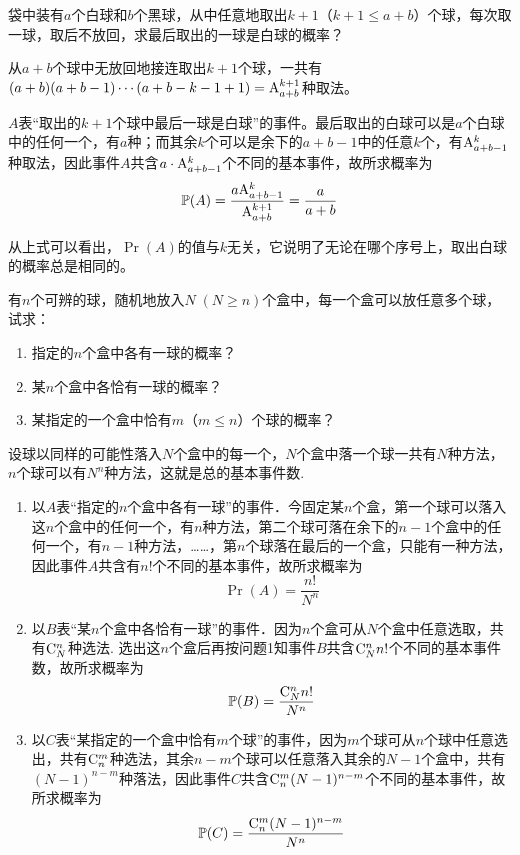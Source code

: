 \begin{example}
    袋中装有$a$个白球和$b$个黑球，从中任意地取出$k+1$（$k+1\le a+b$）个球，每次取一球，取后不放回，求最后取出的一球是白球的概率？
\end{example}

\begin{solution}
    从$a+b$个球中无放回地接连取出$k+1$个球，一共有
$(a+b)(a+b-1)\cdots(a+b-k-1+1)={\rm A}^{k+1}_{a+b}$种取法。

$A$表“取出的$k+1$个球中最后一球是白球”的事件。最后取出的白球可以是$a$个白球中的任何一个，有$a$种；而其余$k$个可以是余下的$a+b-1$中的任意$k$个，有${\rm A}^k_{a+b-1}$种取法，因此事件$A$共含$a\cdot {\rm A}^k_{a+b-1}$个不同的基本事件，故所求概率为
\[\Pr(A)=\frac{a{\rm A}^{k}_{a+b-1}}{{\rm A}^{k+1}_{a+b}}=\frac{a}{a+b}\]

从上式可以看出，$\Pr(A)$的值与$k$无关，它说明了无论在哪个序号上，取出白球的概率总是相同的。
\end{solution}

\begin{example}
    有$n$个可辨的球，随机地放入$N\; (N\ge n)$个盒中，每一个盒可以放任意多个球，试求：
\begin{enumerate}
\item 指定的$n$个盒中各有一球的概率？
\item 某$n$个盒中各恰有一球的概率？
\item 某指定的一个盒中恰有$m$（$m\le n$）个球的概率？
\end{enumerate}
\end{example}

\begin{solution}
    设球以同样的可能性落入$N$个盒中的每一个，$N$个盒中落一个球一共有$N$种方法，$n$个球可以有$N^n$种方法，这就是总的基本事件数.
\begin{enumerate}
\item 以$A$表“指定的$n$个盒中各有一球”的事件．今固定某$n$个盒，第一个球可以落入这$n$个盒中的任何一个，有$n$种方法，第二个球可落在余下的$n-1$个盒中的任何一个，有$n-1$种方法，……，第$n$个球落在最后的一个盒，只能有一种方法，因此事件$A$共含有$n!$个不同的基本事件，故所求概率为
\[\Pr(A)= \frac{n!}{N^n} \]
\item 以$B$表“某$n$个盒中各恰有一球”的事件．因为$n$个盒可从$N$个盒中任意选取，共有$\comb{n}{N}$种选法. 选出这$n$个盒后再按问题1知事件$B$共含$\comb{n}{N}n!$个不同的基本事件数，故所求概率为
\[\Pr(B)=\frac{\comb{n}{N}n!}{N^n}\]
\item 
以$C$表“某指定的一个盒中恰有$m$个球”的事件，因为$m$个球可从$n$个球中任意选出，共有$\comb{m}{n}$种选法，其余$n-m$个球可以任意落入其余的$N-1$个盒中，共有$(N-1)^{n-m}$种落法，因此事件$C$共含$\comb{m}{n}(N-1)^{n-m}$个不同的基本事件，故所求概率为
\[\Pr(C)=\frac{\comb{m}{n}(N-1)^{n-m}}{N^n}\]
\end{enumerate}
\end{solution}

